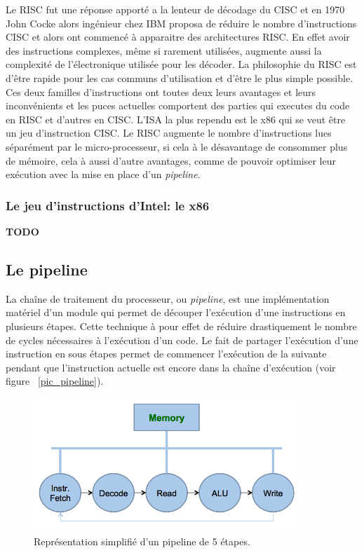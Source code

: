  Le RISC fut une réponse apporté a la lenteur de décodage du CISC et en 1970 John Cocke alors ingénieur chez IBM proposa de réduire le nombre d'instructions CISC et alors ont commencé à apparaitre des architectures RISC. En effet avoir des instructions complexes, même si rarement utilisées, augmente aussi la complexité de l'électronique utilisée pour les décoder. La philosophie du RISC est d'être rapide pour les cas communs d'utilisation et d'être le plus simple possible. Ces deux familles d'instructions ont toutes deux leurs avantages et leurs inconvénients et les puces actuelles comportent des parties qui executes du code en RISC et d'autres en CISC. L'ISA la plus rependu est le x86 qui se veut être un jeu d'instruction CISC. Le RISC augmente le nombre d'instructions lues séparément par le micro-processeur, si cela à le désavantage de consommer plus de mémoire, cela à aussi d'autre avantages, comme de pouvoir optimiser leur exécution avec la mise en place d'un \textit{pipeline}.
 
 \subsubsection{Le jeu d'instructions d'Intel: le x86} \textbf{TODO}
 
 
\subsection{Le pipeline } 
\label{sub_pipeline}
La chaîne de traitement du processeur, ou \textit{pipeline}, est une implémentation matériel d'un module qui permet de découper l'exécution d'une instructions en plusieurs étapes. Cette technique à pour effet de réduire drastiquement le nombre de cycles nécessaires à l'exécution d'un code. Le fait de partager l'exécution d'une instruction en sous étapes permet de commencer l'exécution de la suivante pendant que l'instruction actuelle est encore dans la chaîne d'exécution (voir figure ~\ref{pic_pipeline}).
\begin{figure}
    \center
    \includegraphics[width=10cm]{images/Chapitre1/Neumann.png}
    \caption{\label{pic_Neumann} Représentation simplifié d'un pipeline de 5 étapes.}
\end{figure}

